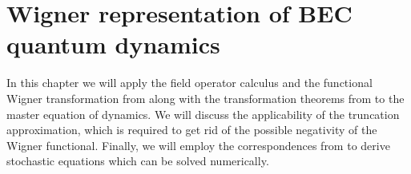 \chapter{Wigner representation of BEC quantum dynamics}
\label{cha:wigner-bec}

In this chapter we will apply the field operator calculus and the functional Wigner transformation from  along with the transformation theorems from  to the master equation of  dynamics.
We will discuss the applicability of the truncation approximation, which is required to get rid of the possible negativity of the Wigner functional.
Finally, we will employ the correspondences from  to derive stochastic equations which can be solved numerically.










